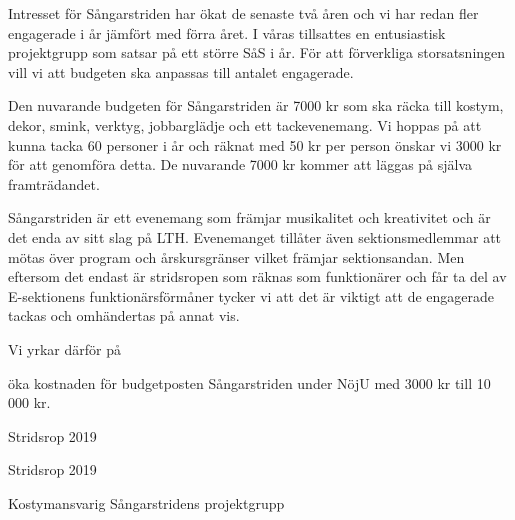 \documentclass[../_main/handlingar.tex]{subfiles}
\begin{document}

Intresset för Sångarstriden har ökat de senaste två åren och vi har redan fler engagerade i år jämfört med förra året. I våras tillsattes en entusiastisk projektgrupp som satsar på ett större SåS i år. För att förverkliga storsatsningen vill vi att budgeten ska anpassas till antalet engagerade. 

Den nuvarande budgeten för Sångarstriden är 7000 kr som ska räcka till kostym, dekor, smink, verktyg, jobbarglädje och ett tackevenemang. Vi hoppas på att kunna tacka 60 personer i år och räknat med 50 kr per person önskar vi 3000 kr för att genomföra detta. De nuvarande 7000 kr kommer att läggas på själva framträdandet. 

Sångarstriden är ett evenemang som främjar musikalitet och kreativitet och är det enda av sitt slag på LTH. Evenemanget tillåter även sektionsmedlemmar att mötas över program och årskursgränser vilket främjar sektionsandan. Men eftersom det endast är stridsropen som räknas som funktionärer och får ta del av E-sektionens funktionärsförmåner tycker vi att det är viktigt att de engagerade tackas och omhändertas på annat vis. 


Vi yrkar därför på
\begin{attsatser}
    \att öka kostnaden för budgetposten Sångarstriden under NöjU med 3000 kr till 10 000 kr.
\end{attsatser}


\begin{signatures}{3}
    \isekt
    \signature{Elsa Lindhé}{Stridsrop 2019}
    \signature{Y Nhi Pham}{Stridsrop 2019}
    \signature{Emma Hjörneby}{Kostymansvarig Sångarstridens projektgrupp}
\end{signatures}
\end{document}
